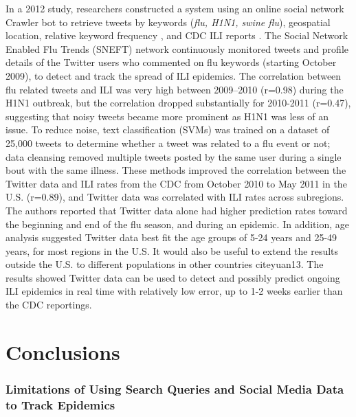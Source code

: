 \documentclass[sigconf]{acmart}
\begin{document}
In a 2012 study, researchers constructed a system using an online social network Crawler 
bot to retrieve tweets by keywords ({\it flu, H1N1, swine flu}), geospatial location, 
relative keyword frequency , and CDC ILI reports \cite{achrekar12}. The Social Network 
Enabled Flu Trends (SNEFT) network continuously monitored tweets and profile details of 
the Twitter users who commented on flu keywords (starting October 2009), to detect and 
track the spread of ILI epidemics. The correlation between flu related tweets and ILI was 
very high between 2009–2010 (r=0.98) during the H1N1 outbreak, but the correlation dropped 
substantially for 2010-2011 (r=0.47), suggesting that noisy tweets became more prominent 
as H1N1 was less of an issue. To reduce noise, text classification (SVMs) was trained on a 
dataset of 25,000 tweets to determine whether a tweet was related to a flu event or not; 
data cleansing removed multiple tweets posted by the same user during a single bout with 
the same illness. These methods improved the correlation between the Twitter data and ILI 
rates from the CDC from October 2010 to May 2011 in the U.S. (r=0.89), and Twitter data was 
correlated with ILI rates across subregions. The authors reported that Twitter data alone 
had higher prediction rates toward the beginning and end of the flu season, and during an 
epidemic. In addition, age analysis suggested Twitter data best fit the age groups of 5-24 
years and 25-49 years,  for most regions in the U.S. It would also be useful to extend the 
results outside the U.S. to different populations in other countries cite{yuan13}. The 
results showed Twitter data can be used to detect and possibly predict ongoing ILI epidemics 
in real time with relatively low error, up to 1-2 weeks earlier than the CDC reportings. 

\section{Conclusions}

\subsubsection{Limitations of Using Search Queries and Social Media Data to Track Epidemics}
\end{document}
